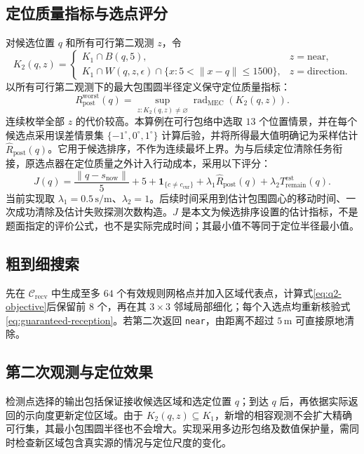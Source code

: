 \subsection{定位质量指标与选点评分}
对候选位置 $q$ 和所有可行第二观测 $z$，令
\begin{equation}
  K_2(q,z)=
  \begin{cases}
    K_1\cap B(q,5), & z=\mathrm{near},\\
    K_1\cap W(q,z,\epsilon)\cap\{x:5<\|x-q\|\leq1500\}, & z=\mathrm{direction}.
  \end{cases}
\end{equation}
以所有可行第二观测下的最大包围圆半径定义保守定位质量指标：
\begin{equation}
  R_{\mathrm{post}}^{\mathrm{worst}}(q)=
  \sup_{z:K_2(q,z)\neq\varnothing}
  \operatorname{rad}_{\mathrm{MEC}}\!\left(K_2(q,z)\right).
\end{equation}
连续枚举全部 $z$ 的代价较高。本算例在可行包络中选取 $13$ 个位置情景，并在每个候选点采用误差情景集 $\{-1^\circ,0^\circ,1^\circ\}$ 计算后验，并将所得最大值明确记为采样估计 $\widehat R_{\mathrm{post}}(q)$。它用于候选排序，不作为连续最坏上界。为与后续定位清除任务衔接，原选点器在定位质量之外计入行动成本，采用以下评分：
\begin{equation}
  J(q)=\frac{\|q-s_{\mathrm{now}}\|}{5}+5
  +\mathbf 1_{\{c\neq c_{\mathrm{cur}}\}}
  +\lambda_1\widehat R_{\mathrm{post}}(q)
  +\lambda_2T_{\mathrm{remain}}^{\mathrm{est}}(q).
  \label{eq:q2-objective}
\end{equation}
当前实现取 $\lambda_1=0.5\,\mathrm{s/m}$、$\lambda_2=1$。后续时间采用到估计包围圆心的移动时间、一次成功清除及估计失败探测次数构造。$J$ 是本文为候选排序设置的估计指标，不是题面指定的评价公式，也不是实际完成时间；其最小值不等同于定位半径最小值。

\subsection{粗到细搜索}
先在 $\mathcal C_{\mathrm{recv}}$ 中生成至多 $64$ 个有效规则网格点并加入区域代表点，计算式\eqref{eq:q2-objective}后保留前 $8$ 个，再在其 $3\times3$ 邻域局部细化；每个入选点均重新核验式\eqref{eq:guaranteed-reception}。若第二次返回 \texttt{near}，由距离不超过 $5\,\mathrm{m}$ 可直接原地清除。

\subsection{第二次观测与定位效果}
检测点选择的输出包括保证接收候选区域和选定位置 $q$；到达 $q$ 后，再依据实际返回的示向度更新定位区域。由于 $K_2(q,z)\subseteq K_1$，新增的相容观测不会扩大精确可行集，其最小包围圆半径也不会增大。实现采用多边形包络及数值保护量，需同时检查新区域包含真实源的情况与定位尺度的变化。

